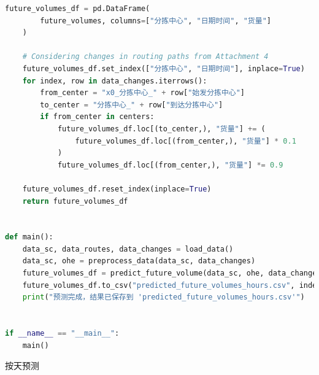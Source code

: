 \documentclass[UTF8,a4paper,10 pt]{article}%
\begin{document}
\begin{lstlisting}[language=python]
    future_volumes_df = pd.DataFrame(
        future_volumes, columns=["分拣中心", "日期时间", "货量"]
    )

    # Considering changes in routing paths from Attachment 4
    future_volumes_df.set_index(["分拣中心", "日期时间"], inplace=True)
    for index, row in data_changes.iterrows():
        from_center = "x0_分拣中心_" + row["始发分拣中心"]
        to_center = "分拣中心_" + row["到达分拣中心"]
        if from_center in centers:
            future_volumes_df.loc[(to_center,), "货量"] += (
                future_volumes_df.loc[(from_center,), "货量"] * 0.1
            )
            future_volumes_df.loc[(from_center,), "货量"] *= 0.9

    future_volumes_df.reset_index(inplace=True)
    return future_volumes_df


def main():
    data_sc, data_routes, data_changes = load_data()
    data_sc, ohe = preprocess_data(data_sc, data_changes)
    future_volumes_df = predict_future_volume(data_sc, ohe, data_changes)
    future_volumes_df.to_csv("predicted_future_volumes_hours.csv", index=False)
    print("预测完成，结果已保存到 'predicted_future_volumes_hours.csv'")


if __name__ == "__main__":
    main()
\end{lstlisting}
\noindent 按天预测
\end{document}
